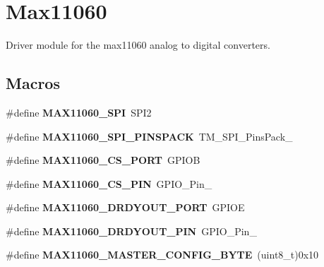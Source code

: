 \hypertarget{group__max11060}{}\section{Max11060}
\label{group__max11060}


Driver module for the max11060 analog to digital converters.  


\subsection*{Macros}
\begin{DoxyCompactItemize}
\item 
\hypertarget{group__max11060_gaffcc56499bb0193fc4969fc91c45b0bc}{}\#define {\bfseries M\+A\+X11060\+\_\+\+S\+P\+I}~S\+P\+I2\label{group__max11060_gaffcc56499bb0193fc4969fc91c45b0bc}

\item 
\hypertarget{group__max11060_ga7a1d4472ae42f42a6b9c61807a67d4eb}{}\#define {\bfseries M\+A\+X11060\+\_\+\+S\+P\+I\+\_\+\+P\+I\+N\+S\+P\+A\+C\+K}~T\+M\+\_\+\+S\+P\+I\+\_\+\+Pins\+Pack\+\_\label{group__max11060_ga7a1d4472ae42f42a6b9c61807a67d4eb}

\item 
\hypertarget{group__max11060_ga7fc0995cf0e78423f9755d99935af928}{}\#define {\bfseries M\+A\+X11060\+\_\+\+C\+S\+\_\+\+P\+O\+R\+T}~G\+P\+I\+O\+B\label{group__max11060_ga7fc0995cf0e78423f9755d99935af928}

\item 
\hypertarget{group__max11060_ga7f1c29b9c4838194bd42d31389355eea}{}\#define {\bfseries M\+A\+X11060\+\_\+\+C\+S\+\_\+\+P\+I\+N}~G\+P\+I\+O\+\_\+\+Pin\+\_\label{group__max11060_ga7f1c29b9c4838194bd42d31389355eea}

\item 
\hypertarget{group__max11060_ga8e4cde147fdce6487363874f4f8d6fdf}{}\#define {\bfseries M\+A\+X11060\+\_\+\+D\+R\+D\+Y\+O\+U\+T\+\_\+\+P\+O\+R\+T}~G\+P\+I\+O\+E\label{group__max11060_ga8e4cde147fdce6487363874f4f8d6fdf}

\item 
\hypertarget{group__max11060_ga07afc3e1d8e16995e23037fe4f174b39}{}\#define {\bfseries M\+A\+X11060\+\_\+\+D\+R\+D\+Y\+O\+U\+T\+\_\+\+P\+I\+N}~G\+P\+I\+O\+\_\+\+Pin\+\_\label{group__max11060_ga07afc3e1d8e16995e23037fe4f174b39}

\item 
\hypertarget{group__max11060_ga47937e5933b0e1ee357c262a4764e784}{}\#define {\bfseries M\+A\+X11060\+\_\+\+M\+A\+S\+T\+E\+R\+\_\+\+C\+O\+N\+F\+I\+G\+\_\+\+B\+Y\+T\+E}~(uint8\+\_\+t)0x10\label{group__max11060_ga47937e5933b0e1ee357c262a4764e784}


\end{DoxyCompactItemize}
